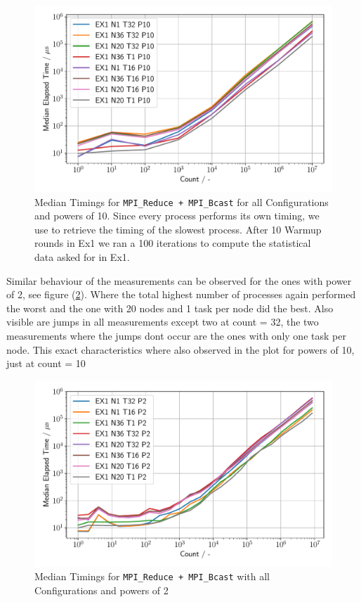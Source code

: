 \begin{figure}[h]
    \begin{center}
        \includegraphics[width=0.8\linewidth]{figures/Ex1_1.pdf}

        \caption{Median Timings for \texttt{MPI\_Reduce + MPI\_Bcast} for all Configurations 
        and powers of 10. Since every  process performs its own timing, we use 
         to retrieve the timing of the slowest process. After 10 Warmup rounds 
        in Ex1 we ran a 100 iterations to compute the statistical data asked for in Ex1.}

        \label{Ex1_P10_median}
    \end{center}
\end{figure}

Similar behaviour of the measurements can be observed for the ones with power of 2, see figure (\ref{Ex1_P2_median}).
Where the total highest number of \MPI processes again performed the worst and the one with 20 nodes and 1 task per 
node did the best. Also visible are jumps in all measurements except two at count = 32, the two measurements where the
jumps dont occur are the ones with only one task per node. This exact characteristics where also observed in the plot
for powers of 10, just at count = 10


\begin{figure}[h]
    \begin{center}
        \includegraphics[width=0.8\linewidth]{figures/Ex1_2.pdf}
        \caption{Median Timings for \texttt{MPI\_Reduce + MPI\_Bcast} with all Configurations and powers of 2}
        \label{Ex1_P2_median}
    \end{center}
\end{figure}

